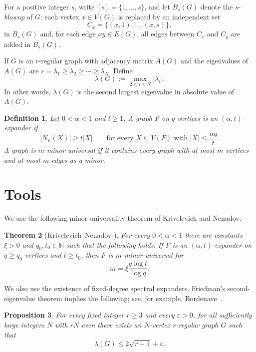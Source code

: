 \documentclass[11pt]{article}
\newtheorem{theorem}{Theorem}
\newtheorem{proposition}[theorem]{Proposition}
\newtheorem{definition}[theorem]{Definition}
\theoremstyle{definition}
\newcommand{\eps}{\varepsilon}
\begin{document}
For a positive integer $s$, write $[s]=\{1,\ldots,s\}$, and let $B_s(G)$
denote the $s$-\emph{blowup} of $G$: each vertex $x\in V(G)$ is replaced
by an independent set
\[
C_x=\{(x,1),\ldots,(x,s)\},
\]
in $B_s(G)$ and, for each edge $xy\in E(G)$, all edges between $C_x$ and $C_y$ are
added in $B_s(G)$.

If $G$ is an $r$-regular graph with adjacency matrix $A(G)$ and the eigenvalues of $A(G)$ are $r=\lambda_1\ge\lambda_2\ge\cdots\ge\lambda_N$. Define
\[
\lambda(G):=\max_{2\le i\le N}|\lambda_i|.
\]
In other words, $\lambda(G)$ is the second largest eigenvalue in absolute value of $A(G)$.

\begin{definition}
Let $0<\alpha<1$ and $t\ge 1$. A graph $F$ on $q$ vertices is an
$(\alpha,t)$-\emph{expander} if
\[
|N_F(X)|\ge t|X|
\qquad\text{for every }X\subseteq V(F)
\text{ with }|X|\le \frac{\alpha q}{t}.
\]
A graph is $m$-\emph{minor-universal} if it contains every graph with at
most $m$ vertices and at most $m$ edges as a minor.
\end{definition}

\section{Tools}

We use the following minor-universality theorem of Krivelevich and Nenadov.

\begin{theorem}[Krivelevich--Nenadov {\cite{KN}}]
\label{thm:KN}
For every $0<\alpha<1$ there are constants $\xi>0$ and
$q_0,t_0\in\mathbb{N}$ such that the following holds. If $F$ is an
$(\alpha,t)$-expander on $q\ge q_0$ vertices and $t\ge t_0$, then $F$ is
$m$-minor-universal for
\[
m=\xi\frac{q\log t}{\log q}.
\]
\end{theorem}

We also use the existence of fixed-degree spectral expanders.
Friedman's second-eigenvalue theorem implies the following; see, for
example, Bordenave~\cite{Bordenave}.

\begin{proposition}
\label{prop:spectral-existence}
For every fixed integer $r\ge 3$ and every $\eps>0$, for all sufficiently
large integers $N$ with $rN$ even there exists an $N$-vertex $r$-regular
graph $G$ such that
\[
\lambda(G)\le 2\sqrt{r-1}+\eps.
\]
\end{proposition}
\end{document}
